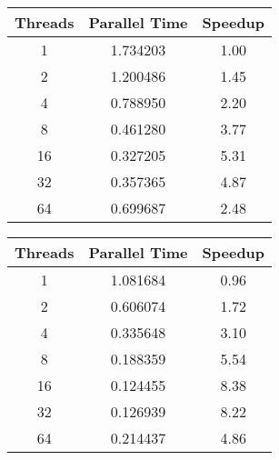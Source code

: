 \documentclass{article}
\begin{document}
    \begin{figure}[H]
        \begin{minipage}{0.45\textwidth}
        \begin{table}[H]
        \begin{center}
            \begin{tabular}{|c|c|c|}
                \hline
                 Threads & Parallel Time & Speedup \\
                 \hline
                 1 & 1.734203 & 1.00 \\
                 2 & 1.200486 & 1.45 \\
                 4 & 0.788950 & 2.20 \\
                 8 & 0.461280 & 3.77 \\
                 16 & 0.327205 & 5.31 \\
                 32 & 0.357365 & 4.87 \\
                 64 & 0.699687 & 2.48 \\
                \hline
            \end{tabular}
        \end{center}
        \end{table}
        \end{minipage}
        \begin{minipage}{0.45\textwidth}
        \begin{table}[H]
\begin{center}
    \begin{tabular}{|c|c|c|}
        \hline
         Threads & Parallel Time & Speedup \\
         \hline
         1 & 1.081684 & 0.96 \\
         2 & 0.606074 & 1.72 \\
         4 & 0.335648 & 3.10 \\
         8 & 0.188359 & 5.54 \\
         16 & 0.124455 & 8.38 \\
         32 & 0.126939 & 8.22 \\
         64 & 0.214437 & 4.86 \\
        \hline
    \end{tabular}
\end{center}
\end{table}
\end{minipage}
\newline
\begin{minipage}{0.45\textwidth}

\end{minipage}
\end{figure}
\end{document}
